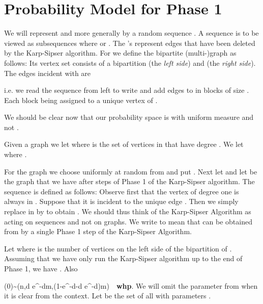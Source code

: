 \documentclass[11pt]{article}
\def\a{\alpha}
\def\whp{{\bf whp}}
\def\vv{\vec{v}}
\newcommand{\beq}[1]{}
\begin{document}
\section{Probability Model for Phase 1}\label{probsec}
We will represent  and more generally  by a random sequence . 
A sequence  is to be viewed as  subsequences  where 
or . 
The 's represent edges that have been deleted by the Karp-Sipser algorithm.
For  we 
define the bipartite (multi-)graph  as follows: Its vertex set consists of a bipartition
 (the {\em left side}) and  (the {\em right side}). The edges incident with  are 

i.e. we read the sequence  from left to write and add edges to  in blocks of size . Each block being
assigned to a unique vertex of . 

We should be clear now that our probability space is  with uniform measure and not 
.

Given a graph
 we let  where  is the set of vertices in 
that have degree . We let  where .

For the graph  we choose  uniformly at random from  and put . Next
let  and let  be the graph  that we have after  
steps of Phase 1 of the Karp-Sipser algorithm. The sequence  is defined as follows: Observe first that
the vertex  of degree one is always in . Suppose that it is incident to the unique edge . Then
we simply replace  in  by  to obtain . We should thus think of the Karp-Sipser Algorithm as acting
on sequences  and not on graphs. We write  to mean that  can be obtained from  by a single 
Phase 1 step of the Karp-Sipser Algorithm. 

Let  where  is the number of vertices on the left
side of the bipartition of . Assuming that we have only run the Karp-Sipser algorithm up to the
end of Phase 1, we have . Also 
\beq{begin}
\vv(0)\sim (n,\a d e^{-\a d}m,(1-e^{-\a d}-\a d e^{-\a d})m)\ \ \whp. 
\eeq
We will omit the parameter
 from  when it is clear from the context. 
Let  be
the set of all  with parameters .
\end{document}
